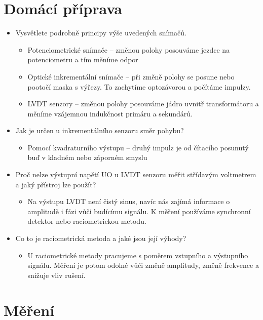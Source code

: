 \documentclass[a4paper,12pt]{article}
\begin{document}
\section{Domácí příprava}
\begin{itemize}
  \item Vysvětlete podrobně principy výše uvedených snímačů.
    \begin{itemize}
      \item Potenciometrické snímače -- změnou polohy posouváme jezdce na potenciometru a tím měníme odpor
      \item Optické inkrementální snímače -- při změně polohy se posune nebo pootočí maska s výřezy. To zachytíme optozávorou a počítáme impulzy.
      \item LVDT senzory -- změnou polohy posouváme jádro uvnitř transformátoru a měníme vzájemnou indukčnost primáru a sekundárů.
    \end{itemize}
    
  \item Jak je určen u inkrementálního senzoru směr pohybu?
    \begin{itemize}
      \item Pomocí kvadraturního výstupu -- druhý impulz je od čítacího posunutý buď v kladném nebo záporném smyslu
    \end{itemize}
    
  \item Proč nelze výstupní napětí UO u LVDT senzoru měřit střídavým voltmetrem a jaký přístroj lze použít?
    \begin{itemize}
      \item Na výstupu LVDT není čistý sinus, navíc nás zajímá informace o amplitudě i fázi vůči budícímu signálu. K měření používáme synchronní detektor nebo raciometrickou metodu.
    \end{itemize}
    
  \item Co to je raciometrická metoda a jaké jsou její výhody?
    \begin{itemize}
      \item U raciometrické metody pracujeme s poměrem vstupního a výstupního signálu. Měření je potom odolné vůči změně amplitudy, změně frekvence a snižuje vliv rušení.
    \end{itemize}
\end{itemize}

\section{Měření}
\end{document}
